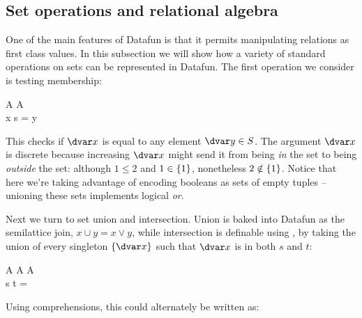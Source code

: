 
\subsection{Set operations and relational algebra}
\label{set-operations-and-relational-algebra}


One of the main features of Datafun is that it permits manipulating
relations as first class values.
%
In this subsection we will show how a variety of standard operations on sets can
be represented in Datafun.
%
The first operation we consider is testing membership:

\begin{code}
  \mem \isa \iso \eqt A \to \tseteq A \to \tbool\\
  \mem \<\pboxvar x \<\mvar s =   {\dvar y}
\end{code}

\noindent
This checks if $\dvar x$ is equal to any element $\dvar y \in \mvar s$. The
argument $\dvar x$ is discrete because increasing $\dvar x$ might send it from
being \emph{in} the set to being \emph{outside} the set: although $1 \le 2$ and
$1 \in \{{1}\}$, nonetheless $2 \notin \{{1}\}$. Notice that here we're
taking advantage of encoding booleans as sets of empty tuples -- unioning these
sets implements logical \emph{or}. 

Next we turn to set union and intersection. Union is baked into Datafun as the
semilattice join, $x \cup y = x \vee y$, while intersection is definable using
\mem, by taking the union of every singleton $\esetraw{\dvar x}$ such that
$\dvar x$ is in both $s$ and $t$:

\begin{code}
  \pwild \cap \pwild \isa \tseteq A \to \tseteq A \to \tseteq A\\
  \mvar s \cap \mvar t =
\end{code}

\noindent
Using comprehensions, this could alternately be written as:

